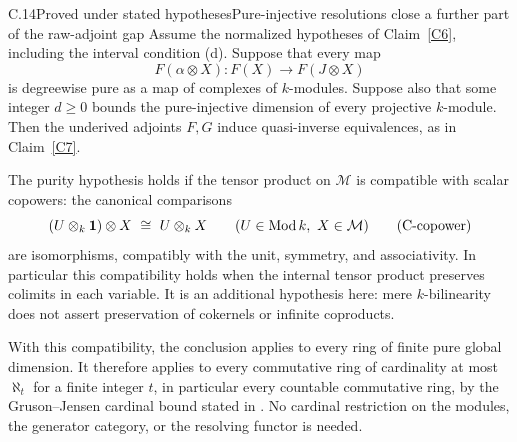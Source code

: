 \begin{claim}{C.14}{Proved under stated hypotheses}{Pure-injective resolutions close a further part of the raw-adjoint gap}\label{C14}
Assume the normalized hypotheses of Claim~\ref{C6}, including the interval condition (d). Suppose that every map
\[
 F(\alpha\otimes X):F(X)\longrightarrow F(J\otimes X)
\]
is degreewise pure as a map of complexes of $k$-modules. Suppose also that some integer $d\geq0$ bounds the pure-injective dimension of every projective $k$-module. Then the underived adjoints $F,G$ induce quasi-inverse equivalences, as in Claim~\ref{C7}.

The purity hypothesis holds if the tensor product on $\mathcal M$ is compatible with scalar copowers: the canonical comparisons
\[
 (U\otimes_k\mathbf1)\otimes X\ \cong\ U\otimes_kX
 \qquad(U\in\operatorname{Mod} k,\ X\in\mathcal M)
 \tag{C-copower}\label{Ccopower}
\]
are isomorphisms, compatibly with the unit, symmetry, and associativity. In particular this compatibility holds when the internal tensor product preserves colimits in each variable. It is an additional hypothesis here: mere $k$-bilinearity does not assert preservation of cokernels or infinite coproducts.

With this compatibility, the conclusion applies to every ring of finite pure global dimension. It therefore applies to every commutative ring of cardinality at most $\aleph_t$ for a finite integer $t$, in particular every countable commutative ring, by the Gruson--Jensen cardinal bound stated in \citet[Theorem 2.6.3]{BensonGnacadja1999}. No cardinal restriction on the modules, the generator category, or the resolving functor is needed.
\end{claim}
